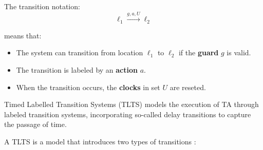 The transition notation:
\[
\ell_1 \xrightarrow{g, a, U} \ell_2
\]

means that:
\begin{itemize}
    \item The system can transition from location \( \ell_1 \) to \( \ell_2 \) if the \textbf{guard} \( g \) is valid.
    \item The transition is labeled by an \textbf{action} \( a \).
    \item When the transition occurs, the \textbf{clocks} in set \( U \) are reseted.
\end{itemize}








Timed Labelled Transition Systems (TLTS) models the execution of TA through labeled transition systems, incorporating so-called delay transitions to capture the passage of time.


A TLTS is a model that introduces two types of transitions \cite{baier2008principles}: 


